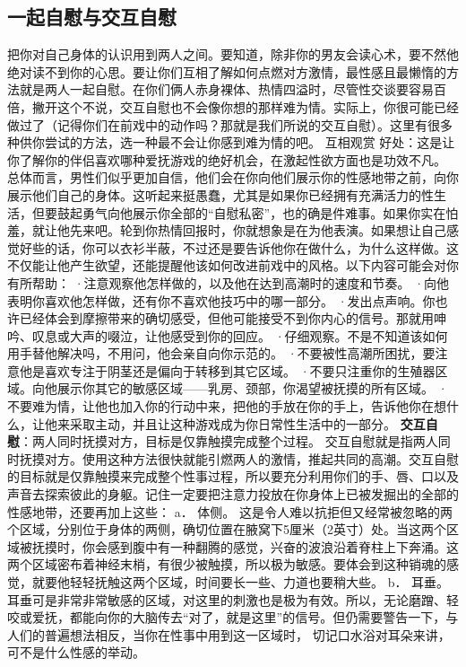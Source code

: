 \documentclass[12pt,UTF8,openany]{ctexbook}
\begin{document}
\subsection*{一起自慰与交互自慰}
把你对自己身体的认识用到两人之间。要知道，除非你的男友会读心术，要不然他绝对读不到你的心思。要让你们互相了解如何点燃对方激情，最性感且最懒惰的方法就是两人一起自慰。在你们俩人赤身裸体、热情四溢时，尽管性交谈要容易百倍，撇开这个不说，交互自慰也不会像你想的那样难为情。实际上，你很可能已经做过了（记得你们在前戏中的动作吗？那就是我们所说的交互自慰）。这里有很多种供你尝试的方法，选一种最不会让你感到难为情的吧。
互相观赏
好处：这是让你了解你的伴侣喜欢哪种爱抚游戏的绝好机会，在激起性欲方面也是功效不凡。
总体而言，男性们似乎更加自信，他们会在你向他们展示你的性感地带之前，向你展示他们自己的身体。这听起来挺愚蠢，尤其是如果你已经拥有充满活力的性生活，但要鼓起勇气向他展示你全部的“自慰私密”，也的确是件难事。如果你实在怕羞，就让他先来吧。轮到你热情回报时，你就想象是在为他表演。如果想让自己感觉好些的话，你可以衣衫半蔽，不过还是要告诉他你在做什么，为什么这样做。这不仅能让他产生欲望，还能提醒他该如何改进前戏中的风格。以下内容可能会对你有所帮助：
·注意观察他怎样做的，以及他在达到高潮时的速度和节奏。
·向他表明你喜欢他怎样做，还有你不喜欢他技巧中的哪一部分。
·发出点声响。你也许已经体会到摩擦带来的确切感受，但他可能接受不到你内心的信号。那就用呻吟、叹息或大声的啜泣，让他感受到你的回应。
·仔细观察。不是不知道该如何用手替他解决吗，不用问，他会亲自向你示范的。
·不要被性高潮所困扰，要注意他是喜欢专注于阴茎还是偏向于转移到其它区域。
·不要只注重你的生殖器区域。向他展示你其它的敏感区域——乳房、颈部，你渴望被抚摸的所有区域。
·不要难为情，让他也加入你的行动中来，把他的手放在你的手上，告诉他你在想什么，让他来采取主动，并且让这种游戏成为你日常性生活中的一部分。
\textbf{交互自慰}：两人同时抚摸对方，目标是仅靠触摸完成整个过程。
交互自慰就是指两人同时抚摸对方。使用这种方法很快就能引燃两人的激情，推起共同的高潮。交互自慰的目标就是仅靠触摸来完成整个性事过程，所以要充分利用你们的手、唇、口以及声音去探索彼此的身躯。记住一定要把注意力投放在你身体上已被发掘出的全部的性感地带，还要再加上这些：
a． 体侧。
这是令人难以抗拒但又经常被忽略的两个区域，分别位于身体的两侧，确切位置在腋窝下5厘米（2英寸）处。当这两个区域被抚摸时，你会感到腹中有一种翻腾的感觉，兴奋的波浪沿着脊柱上下奔涌。这两个区域密布着神经末梢，有很少被触摸，所以极为敏感。要体会到这种销魂的感觉，就要他轻轻抚触这两个区域，时间要长一些、力道也要稍大些。
b． 耳垂。
耳垂可是非常非常敏感的区域，对这里的刺激也是极为有效。所以，无论磨蹭、轻咬或爱抚，都能向你的大脑传去“对了，就是这里”的信号。但仍需要警告一下，与人们的普遍想法相反，当你在性事中用到这一区域时， 切记口水浴对耳朵来讲，可不是什么性感的举动。
\end{document}
